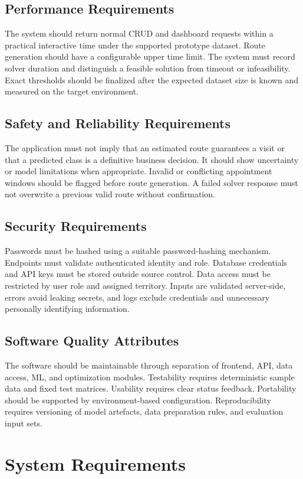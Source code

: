 \documentclass[12pt,a4paper,oneside]{report}
\begin{document}
\subsection{Performance Requirements}
The system should return normal CRUD and dashboard requests within a practical interactive time under the supported prototype dataset. Route generation should have a configurable upper time limit. The system must record solver duration and distinguish a feasible solution from timeout or infeasibility. Exact thresholds should be finalized after the expected dataset size is known and measured on the target environment.

\subsection{Safety and Reliability Requirements}
The application must not imply that an estimated route guarantees a visit or that a predicted class is a definitive business decision. It should show uncertainty or model limitations when appropriate. Invalid or conflicting appointment windows should be flagged before route generation. A failed solver response must not overwrite a previous valid route without confirmation.

\subsection{Security Requirements}
Passwords must be hashed using a suitable password-hashing mechanism. Endpoints must validate authenticated identity and role. Database credentials and API keys must be stored outside source control. Data access must be restricted by user role and assigned territory. Inputs are validated server-side, errors avoid leaking secrets, and logs exclude credentials and unnecessary personally identifying information.

\subsection{Software Quality Attributes}
The software should be maintainable through separation of frontend, API, data access, ML, and optimization modules. Testability requires deterministic sample data and fixed test matrices. Usability requires clear status feedback. Portability should be supported by environment-based configuration. Reproducibility requires versioning of model artefacts, data preparation rules, and evaluation input sets.

\section{System Requirements}
\end{document}
